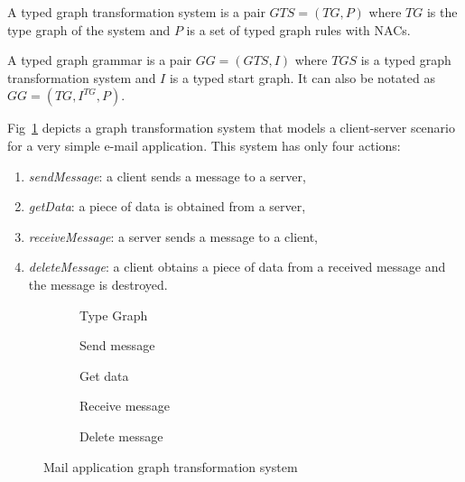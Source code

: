 \begin{definition} A typed graph transformation system is a pair $GTS = \left(TG,P\right)$ where $TG$ is the type graph of the system and $P$ is a set of typed graph rules with NACs.

  A typed graph grammar is a pair $GG = \left(GTS,I\right)$ where $TGS$ is a typed graph transformation system and $I$ is a typed start graph. It can also be notated as $GG = \left(TG, I^{TG},P \right)$.

\end{definition}

\begin{example} Fig~\ref{fig:gts:mail} depicts a graph transformation system that models a client-server scenario for a very simple e-mail application. This system has only four actions: 

\begin{enumerate}
  \item \emph{sendMessage}: a client sends a message to a server,
  \item \emph{getData}: a piece of data is obtained from a server,
  \item \emph{receiveMessage}: a server sends a message to a client,
  \item \emph{deleteMessage}: a client obtains a piece of data from a received message and the message is destroyed.
\end{enumerate}

\begin{figure}[!ht]
  \centering
  \begin{subfigure}[t]{.5\textwidth}
    \centerline{}
    \caption{Type Graph}
  \end{subfigure}
  \begin{subfigure}[t]{.5\textwidth}
    \centerline{}
    \caption{Send message}
  \end{subfigure}%
  \begin{subfigure}[t]{.5\textwidth}
    \centerline{}
    \caption{Get data}
  \end{subfigure}
  \begin{subfigure}[t]{.5\textwidth}
    \centerline{}
    \caption{Receive message}
  \end{subfigure}%
  \begin{subfigure}[t]{.5\textwidth}
    \centerline{}
    \caption{Delete message}
  \end{subfigure}
  \caption{Mail application graph transformation system}\label{fig:gts:mail}
\end{figure}


\end{example}
